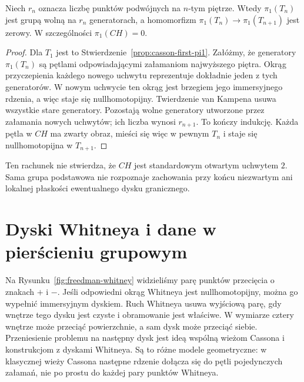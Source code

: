 \begin{stwierdzenie}
\label{prop:casson-tower-pi1}
Niech $r_n$ oznacza liczbę punktów podwójnych
na $n$-tym piętrze. Wtedy
$\pi_1(T_n)$ jest grupą wolną na $r_n$ generatorach,
a homomorfizm
$\pi_1(T_n)\to\pi_1(T_{n+1})$ jest zerowy.
W szczególności $\pi_1(CH)=0$.
\end{stwierdzenie}
\begin{proof}
Dla $T_1$ jest to
Stwierdzenie~\ref{prop:casson-first-pi1}.
Załóżmy, że generatory $\pi_1(T_n)$ są pętlami
odpowiadającymi załamaniom najwyższego piętra.
Okrąg przyczepienia każdego nowego uchwytu
reprezentuje dokładnie jeden z tych generatorów.
W nowym uchwycie ten okrąg jest brzegiem jego
immersyjnego rdzenia, a więc staje się
nullhomotopijny. Twierdzenie van Kampena usuwa
wszystkie stare generatory. Pozostają wolne
generatory utworzone przez załamania nowych
uchwytów; ich liczba wynosi $r_{n+1}$.
To kończy indukcję. Każda pętla w $CH$ ma zwarty
obraz, mieści się więc w pewnym $T_n$ i staje się
nullhomotopijna w $T_{n+1}$.
\end{proof}

Ten rachunek nie stwierdza, że $CH$ jest standardowym
otwartym uchwytem $2$. Sama grupa podstawowa nie
rozpoznaje zachowania przy końcu niezwartym ani
lokalnej płaskości ewentualnego dysku granicznego.

\section{Dyski Whitneya i dane w pierścieniu grupowym}
\label{sec:casson-whitney}

Na Rysunku~\ref{fig:freedman-whitney} widzieliśmy
parę punktów przecięcia o znakach $+$ i $-$.
Jeśli odpowiedni okrąg Whitneya jest
nullhomotopijny, można go wypełnić immersyjnym
dyskiem. Ruch Whitneya usuwa wyjściową parę,
gdy wnętrze tego dysku jest czyste i obramowanie
jest właściwe. W wymiarze cztery wnętrze może
przeciąć powierzchnie, a sam dysk może przeciąć
siebie. Przeniesienie problemu na następny dysk
jest ideą wspólną wieżom Cassona i konstrukcjom
z dyskami Whitneya. Są to różne modele geometryczne:
w klasycznej wieży Cassona następne rdzenie
dołącza się do pętli pojedynczych załamań, nie
po prostu do każdej pary punktów Whitneya.


